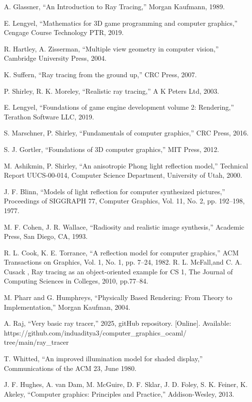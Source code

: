 \documentclass[conference]{IEEEtran}
\begin{document}
\begin{thebibliography}{00}
 A. Glassner, ``An Introduction to Ray Tracing,'' Morgan Kaufmann, 1989.

 E. Lengyel, ``Mathematics for 3D game programming and computer graphics,'' Cengage Course Technology PTR, 2019.

 R. Hartley, A. Zisserman, ``Multiple view geometry in computer vision,'' Cambridge University Press, 2004.

 K. Suffern, ``Ray tracing from the ground up,'' CRC Press, 2007.

 P. Shirley, R. K. Moreley, ``Realistic ray tracing,'' A K Peters Ltd, 2003.

 E. Lengyel, ``Foundations of game engine development volume 2: Rendering,'' Terathon Software LLC, 2019.

 S. Marschner, P. Shirley, ``Fundamentals of computer graphics,'' CRC Press, 2016.

 S. J. Gortler, ``Foundations of 3D computer graphics,'' MIT Press, 2012.

 M. Ashikmin, P. Shirley, ``An anisotropic Phong light reflection model,'' Technical Report UUCS-00-014, Computer Science Department, University of Utah, 2000.

 J. F. Blinn, ``Models of light reflection for computer synthesized pictures,'' Proceedings of SIGGRAPH 77, Computer Graphics, Vol. 11, No. 2, pp. 192–198, 1977.

 M. F. Cohen, J. R. Wallace, ``Radiosity and realistic image synthesis,'' Academic Press, San Diego, CA, 1993.

 R. L. Cook, K. E. Torrance, ``A reflection model for computer graphics,'' ACM Transactions on Graphics, Vol. 1, No. 1, pp. 7–24, 1982.
 R. L. McFall,and C. A. Cusack , Ray tracing as an object-oriented example for CS 1, The Journal of Computing Sciences in Colleges, 2010, pp.77--84.

 M. Pharr and G. Humphreys, ``Physically Based Rendering: From Theory to Implementation,'' Morgan Kaufman, 2004.


 A. Raj, ``Very basic ray tracer,'' 2025, gitHub repository. [Online]. Available: https://github.com/induaditya3/computer\_graphics\_ocaml/\\tree/main/ray\_tracer


 T. Whitted, ``An improved illumination model for shaded display,'' Communications of the ACM 23, June 1980.

 J. F. Hughes, A. van Dam, M. McGuire, D. F. Sklar, J. D. Foley, S. K. Feiner, K. Akeley, ``Computer graphics: Principles and Practice,'' Addison-Wesley, 2013.
\end{thebibliography}
\end{document}
